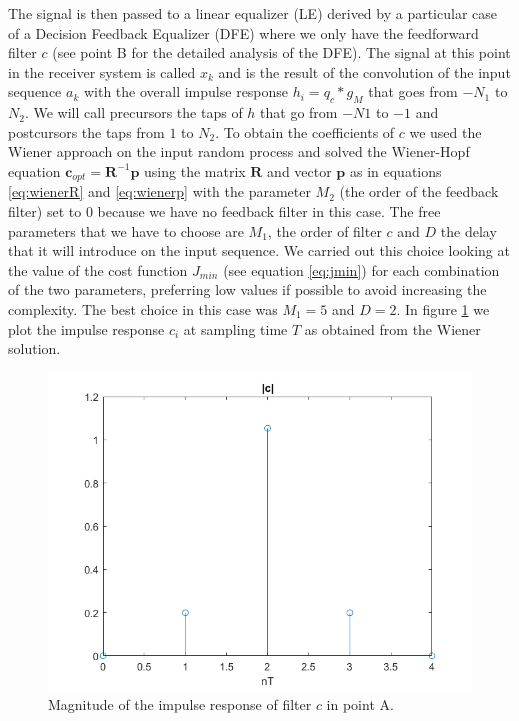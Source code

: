 \documentclass[a4paper,11.5pt]{article}
\newcommand{\vt}{\boldsymbol}
\begin{document}
The signal is then passed to a linear equalizer (LE) derived by a particular case of a Decision Feedback Equalizer (DFE) where we only have the feedforward filter $c$ (see point B for the detailed analysis of the DFE). The signal at this point in the receiver system is called $x_k$ and is the result of the convolution of the input sequence $a_k$ with the overall impulse response $h_i = q_c * g_M$ that goes from $-N_1$ to $N_2$. We will call precursors the taps of $h$ that go from $-N1$ to $-1$ and postcursors the taps from $1$ to $N_2$. To obtain the coefficients of $c$ we used the Wiener approach on the input random process and solved the Wiener-Hopf equation $\vt{c}_{opt}=\vt{R}^{-1}\vt{p}$ using the matrix $\vt{R}$ and vector $\vt{p}$ as in equations \ref{eq:wienerR} and \ref{eq:wienerp} with the parameter $M_2$ (the order of the feedback filter) set to $0$ because we have no feedback filter in this case. The free parameters that we have to choose are $M_1$, the order of filter $c$ and $D$ the delay that it will introduce on the input sequence. We carried out this choice looking at the value of the cost function $J_{min}$ (see equation \ref{eq:jmin}) for each combination of the two parameters, preferring low values if possible to avoid increasing the complexity. The best choice in this case was $M_1=5$ and $D=2$.
In figure \ref{fig:A_c} we plot the impulse response $c_i$ at sampling time $T$ as obtained from the Wiener solution. 

\begin{figure}[ht]
	\begin{center}   
		\includegraphics[width=\textwidth]{figs/A_c.png} 
		\caption{Magnitude of the impulse response of filter $c$ in point A.}
		\label{fig:A_c}
	\end{center}
\end{figure}
\end{document}

